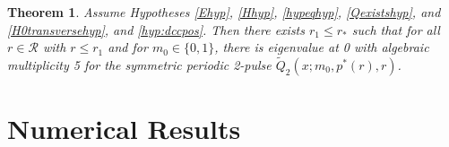 \documentclass[11pt,reqno]{amsart}
\theoremstyle{plain}
\newtheorem{theorem}{Theorem}
\theoremstyle{definition}
\theoremstyle{remark}
\begin{document}
\begin{theorem}\label{theorem:2peigssym}
Assume Hypotheses \ref{Ehyp}, \ref{Hhyp}, \ref{hypeqhyp}, \ref{Qexistshyp}, and \ref{H0transversehyp}, and \ref{hyp:dccpos}. Then there exists $r_1 \leq r_*$ such that for all $r \in \mathcal{R}$ with $r \leq r_1$ and for $m_0 \in \{0, 1\}$, there is eigenvalue at 0 with algebraic multiplicity 5 for the symmetric periodic 2-pulse $\tilde{Q}_2(x; m_0, p^*(r), r)$.
\end{theorem}

\section{Numerical Results}\label{sec:numerics}

\end{document}

